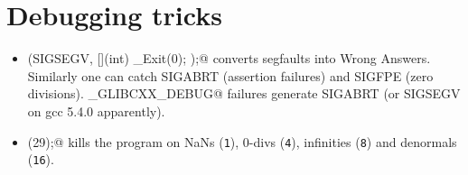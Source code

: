 \section{Debugging tricks}
	\begin{itemize}
		\item \verb@signal(SIGSEGV, [](int) { _Exit(0); });@ converts segfaults into Wrong Answers.
			Similarly one can catch SIGABRT (assertion failures) and SIGFPE (zero divisions).
			\verb@_GLIBCXX_DEBUG@ failures generate SIGABRT (or SIGSEGV on gcc 5.4.0 apparently).
		\item \verb@feenableexcept(29);@ kills the program on NaNs (\texttt 1), 0-divs (\texttt 4), infinities (\texttt 8) and denormals (\texttt{16}).
	\end{itemize}

